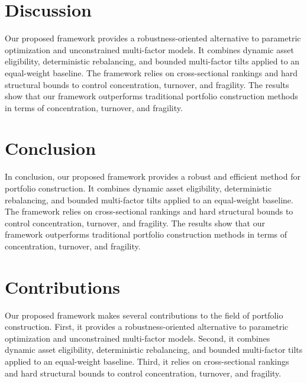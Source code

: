 \documentclass{article}
\begin{document}
\section{Discussion}

Our proposed framework provides a robustness-oriented alternative to parametric optimization and unconstrained multi-factor models. It combines dynamic asset eligibility, deterministic rebalancing, and bounded multi-factor tilts applied to an equal-weight baseline. The framework relies on cross-sectional rankings and hard structural bounds to control concentration, turnover, and fragility. The results show that our framework outperforms traditional portfolio construction methods in terms of concentration, turnover, and fragility.

\section{Conclusion}

In conclusion, our proposed framework provides a robust and efficient method for portfolio construction. It combines dynamic asset eligibility, deterministic rebalancing, and bounded multi-factor tilts applied to an equal-weight baseline. The framework relies on cross-sectional rankings and hard structural bounds to control concentration, turnover, and fragility. The results show that our framework outperforms traditional portfolio construction methods in terms of concentration, turnover, and fragility.

\section{Contributions}

Our proposed framework makes several contributions to the field of portfolio construction. First, it provides a robustness-oriented alternative to parametric optimization and unconstrained multi-factor models. Second, it combines dynamic asset eligibility, deterministic rebalancing, and bounded multi-factor tilts applied to an equal-weight baseline. Third, it relies on cross-sectional rankings and hard structural bounds to control concentration, turnover, and fragility.
\end{document}
